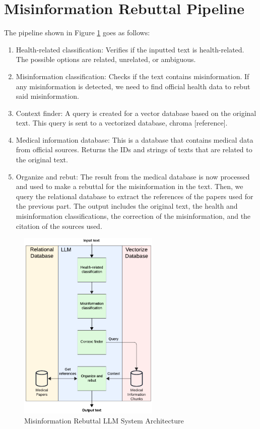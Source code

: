 \section{Misinformation Rebuttal Pipeline}

The pipeline shown in Figure \ref{fig:llm} goes as follows:

\begin{enumerate}
	\item Health-related classification: Verifies if the inputted text is health-related. The possible options are related, unrelated, or ambiguous.  
	\item Misinformation classification: Checks if the text contains misinformation. If any misinformation is detected, we need to find official health data to rebut said misinformation.
	\item	Context finder: A query is created for a vector database based on the original text. This query is sent to a vectorized database, chroma [reference].
	\item	Medical information database:  This is a database that contains medical data from official sources. Returns the IDs and strings of texts that are related to the original text.
	\item	Organize and rebut: The result from the medical database is now processed and used to make a rebuttal for the misinformation in the text. Then, we query the relational database to extract the references of the papers used for the previous part.
	The output includes the original text, the health and misinformation classifications, the correction of the misinformation, and the citation of the sources used. 
\end{enumerate}

\begin{figure}[H]
	\begin{center}
		\includegraphics[width=0.6\textwidth]{images/LLM_Pipeline} %
	\end{center}
	\caption{Misinformation Rebuttal LLM System Architecture} %
	\label{fig:llm}
\end{figure}

